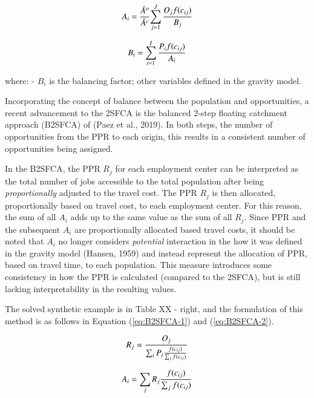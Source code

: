 \documentclass[]{elsarticle} %
\begin{document}
\begin{equation}
\label{eq:Inverse-balancing-1}
A_{i} = \frac{\bar A^{o}}{\bar A^{c}}{\sum_{j=1}^{J} \frac{O_{j}f(c_{ij})}{B_{j}}}\\
\end{equation}

\begin{equation}
\label{eq:Inverse-balancing-2}
B_{i} = {\sum_{i=1}^{I} \frac{P_{i}f(c_{ij})}{A_{i}}}\\
\end{equation}

\noindent where: - \(B_{i}\) is the balancing factor; other variables
defined in the gravity model.

Incorporating the concept of balance between the population and
opportunities, a recent advancement to the 2SFCA is the balanced 2-step
floating catchment approach (B2SFCA) of (Paez et al., 2019). In both
steps, the number of opportunities from the PPR to each origin, this
results in a consistent number of opportunities being assigned.

In the B2SFCA, the PPR \(R_{j}\) for each employment center can be
interpreted as the total number of jobs accessible to the total
population after being \emph{proportionally} adjusted to the travel
cost. The PPR \(R_{j}\) is then allocated, proportionally based on
travel cost, to each employment center. For this reason, the sum of all
\(A_{i}\) adds up to the same value as the sum of all \(R_{j}\). Since
PPR and the subsequent \(A_{i}\) are proportionally allocated based
travel costs, it should be noted that \(A_{i}\) no longer considers
\emph{potential} interaction in the how it was defined in the gravity
model (Hansen, 1959) and instead represent the allocation of PPR, based
on travel time, to each population. This measure introduces some
consistency in how the PPR is calculated (compared to the 2SFCA), but is
still lacking interpretability in the resulting values.

The solved synthetic example is in Table XX - right, and the formulation
of this method is as follows in Equation (\ref{eq:B2SFCA-1}) and
(\ref{eq:B2SFCA-2}).

\begin{equation}
\label{eq:B2SFCA-1}
R_{j} = \frac{O_{j}}{\sum_i P_{i} \frac{f(c_{ij})}{\sum_j f(c_{ij})}}\\
\end{equation}

\begin{equation}
\label{eq:B2SFCA-2}
A_{i} = {\sum_j R_{j}\frac{f(c_{ij})}{\sum_j f(c_{ij})}}\\
\end{equation}
\end{document}

